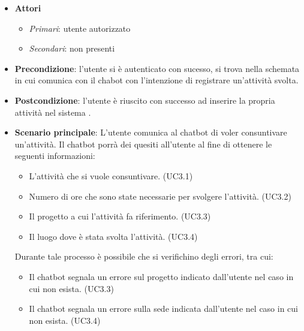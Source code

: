 \begin{itemize}
    \item \textbf{Attori}
    \begin{itemize} 
        \item \textit{Primari}: utente autorizzato
        \item \textit{Secondari}: non presenti
    \end{itemize}
 \item \textbf{Precondizione}: l'utente si è autenticato con sucesso, si trova nella schemata in cui comunica con il chabot con l'intenzione di registrare un'attività svolta. 
 \item \textbf{Postcondizione}: l'utente è riuscito con successo ad inserire la propria attività nel sistema .  
 \item \textbf{Scenario principale}: L'utente comunica al chatbot di voler consuntivare un'attività. Il chatbot porrà dei quesiti all'utente al fine di ottenere le seguenti informazioni: 
    \begin{itemize}
        \item L'attività che si vuole consuntivare. (UC3.1)
        \item Numero di ore che sono state necessarie per svolgere l'attività. (UC3.2)
        \item Il progetto a cui l'attività fa riferimento. (UC3.3)
        \item Il luogo dove è stata svolta l'attività. (UC3.4)
    \end{itemize}
\newpage
 Durante tale processo è possibile che si verifichino degli errori, tra cui: 
    \begin{itemize}
        \item Il chatbot segnala un errore sul progetto indicato dall'utente nel caso in cui non esista. (UC3.3)
        \item Il chatbot segnala un errore sulla sede indicata dall'utente nel caso in cui non esista. (UC3.4)
    \end{itemize}
\end{itemize}

